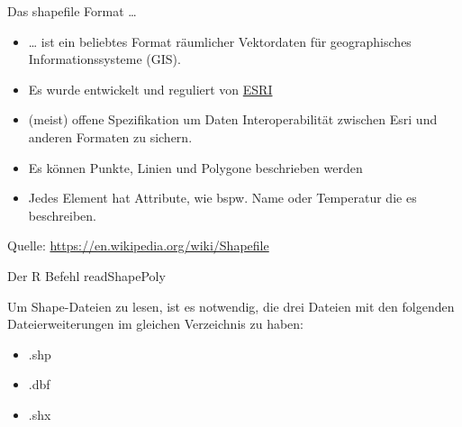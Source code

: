\documentclass[ignorenonframetext,]{beamer}
\providecommand{\tightlist}{%
  \setlength{\itemsep}{0pt}\setlength{\parskip}{0pt}}
\begin{document}
\begin{frame}{Das shapefile Format \ldots{}}

\begin{itemize}
\item
  \ldots{} ist ein beliebtes Format räumlicher Vektordaten für
  geographisches Informationssysteme (GIS).
\item
  Es wurde entwickelt und reguliert von
  \href{http://www.esri.com/}{ESRI}
\item
  (meist) offene Spezifikation um Daten Interoperabilität zwischen Esri
  und anderen Formaten zu sichern.
\item
  Es können Punkte, Linien und Polygone beschrieben werden
\item
  Jedes Element hat Attribute, wie bspw. Name oder Temperatur die es
  beschreiben.
\end{itemize}

Quelle: \url{https://en.wikipedia.org/wiki/Shapefile}

\end{frame}

\begin{frame}{Der R Befehl readShapePoly}

Um Shape-Dateien zu lesen, ist es notwendig, die drei Dateien mit den
folgenden Dateierweiterungen im gleichen Verzeichnis zu haben:

\begin{itemize}
\tightlist
\item
  .shp
\item
  .dbf
\item
  .shx
\end{itemize}

\end{frame}
\end{document}
